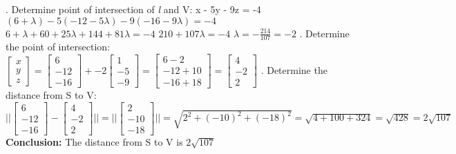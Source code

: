 . Determine point of intersection of \textit{l} and V:
\newline
x - 5y - 9z = -4
\newline
$(6 + \lambda) - 5(-12 - 5\lambda) - 9(-16 - 9\lambda) = -4$
\newline
$6 + \lambda + 60 + 25\lambda + 144 + 81\lambda = -4$
\newline
$210 + 107\lambda = -4$
\newline
$\lambda = -\frac{214}{107} = -2$
. Determine the point of intersection:
\newline
$\begin{bmatrix} x \\ y \\ z\end{bmatrix} = \begin{bmatrix} 6 \\ -12 \\ -16\end{bmatrix} + -2 \begin{bmatrix} 1 \\ -5 \\ -9 \end{bmatrix} = \begin{bmatrix} 6 - 2 \\ -12 + 10 \\ -16 + 18 \end{bmatrix} = \begin{bmatrix} 4 \\ -2 \\ 2 \end{bmatrix}$
. Determine the distance from S to V:
\newline
$||\begin{bmatrix} 6 \\ -12 \\ -16 \end{bmatrix} - \begin{bmatrix} 4 \\ -2 \\ 2 \end{bmatrix}|| = ||\begin{bmatrix} 2 \\ -10 \\ -18 \end{bmatrix}|| = \sqrt{2^2 + (-10)^2 + (-18)^2} = \sqrt{4 + 100 + 324} = \sqrt{428} = 2\sqrt{107}$
\newline
\textbf{Conclusion:}
\newline
The distance from S to V is $2\sqrt{107}$